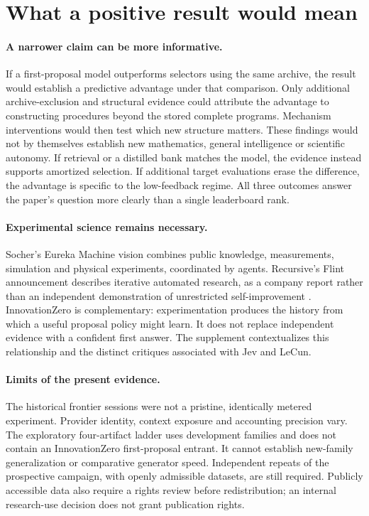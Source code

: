 \section{What a positive result would mean}
\label{sec:discussion}

\paragraph{A narrower claim can be more informative.}
If a first-proposal model outperforms selectors using the same archive, the
result would establish a predictive advantage under that comparison. Only
additional archive-exclusion and structural evidence could attribute the
advantage to constructing procedures beyond the stored complete programs.
Mechanism interventions would then test which new structure matters.
These findings would not by themselves establish new
mathematics, general intelligence or scientific autonomy. If retrieval or a
distilled bank matches the model, the evidence instead supports amortized
selection. If additional target evaluations erase the difference, the
advantage is specific to the low-feedback regime. All three outcomes answer
the paper's question more clearly than a single leaderboard rank.

\paragraph{Experimental science remains necessary.}
Socher's Eureka Machine vision combines public knowledge, measurements,
simulation and physical experiments, coordinated by agents. Recursive's
Flint announcement describes iterative automated research, as a company
report rather than an independent demonstration of unrestricted
self-improvement \citep{socher,socherpillars,recursiveflint}. InnovationZero is
complementary: experimentation produces the history from which a useful
proposal policy might learn. It does not replace independent evidence with
a confident first answer. The supplement contextualizes this relationship
and the distinct critiques associated with Jev and LeCun.

\paragraph{Limits of the present evidence.}
The historical frontier sessions were not a pristine, identically metered
experiment. Provider identity, context exposure and accounting precision
vary. The exploratory four-artifact ladder uses development families and
does not contain an InnovationZero first-proposal entrant. It cannot
establish new-family generalization or comparative generator speed.
Independent repeats of the prospective campaign, with openly admissible
datasets, are still required. Publicly accessible data also require a
rights review before redistribution; an internal research-use decision
does not grant publication rights.


